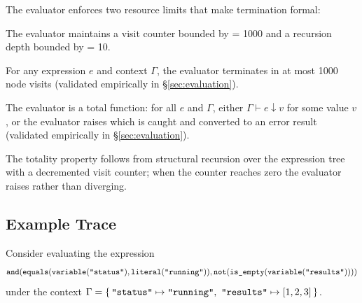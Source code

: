 The evaluator enforces two resource limits that make termination formal:

\begin{prop}
\label{prop:resource-limits}
The evaluator maintains a visit counter bounded by
 = 1000 and a recursion depth bounded by
 = 10.
\end{prop}

\begin{prop}[Termination]
\label{prop:termination}
For any expression $e$ and context $\Gamma$, the evaluator terminates in at most
1000 node visits (validated empirically in \S\ref{sec:evaluation}).
\end{prop}

\begin{prop}[Totality]
\label{prop:totality}
The evaluator is a total function: for all $e$ and $\Gamma$, either
$\Gamma \vdash e \downarrow v$ for some value $v$, or the evaluator raises
 which is caught and converted to an error result
(validated empirically in \S\ref{sec:evaluation}).
\end{prop}

The totality property follows from structural recursion over the expression tree
with a decremented visit counter; when the counter reaches zero the evaluator
raises  rather than diverging.

\subsection{Example Trace}\label{sec:expr-example}

Consider evaluating the expression%
\[
\identifiable{and}(
  \identifiable{equals}(
    \identifiable{variable}(\text{\texttt{"status"}}),
    \identifiable{literal}(\text{\texttt{"running"}})),
  \identifiable{not}(
    \identifiable{is\_empty}(
      \identifiable{variable}(\text{\texttt{"results"}}))))
\]
under the context $\Gamma = \{\,\text{\texttt{"status"}} \mapsto
\text{\texttt{"running"}},\ \text{\texttt{"results"}} \mapsto [1,2,3]\,\}$.

